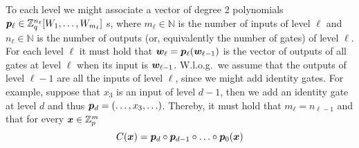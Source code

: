 To each level we might associate a vector of degree 2 polynomials ${\boldsymbol{p}}_\ell \in \mathbb{Z}_q^{n_\ell}[W_1,\ldots,W_{m_\ell}]$ s, where $m_\ell\in\mathbb{N}$ is the number of inputs of level $\ell$ and $n_\ell\in\mathbb{N}$ is the number of outputs (or, equivalently the number of gates) of level $\ell$. For each level $\ell$ it must hold that ${\boldsymbol{w}}_\ell={\boldsymbol{p}}_\ell({\boldsymbol{w}}_{\ell-1})$ is the vector of outputs of all gates at level $\ell$ when its input is ${\boldsymbol{w}}_{\ell-1}$.
W.l.o.g.~we assume that the outputs of level $\ell-1$ are all the inputs of level $\ell$, since we might add identity gates. For example, suppose that $x_3$ is an input of level $d-1$, then we add an identity gate at level $d$ and thus ${\boldsymbol{p}}_d=(\ldots,x_3,\ldots)$.
 Thereby, it must hold that $ m_\ell = n_{\ell-1}$ and that for every ${\boldsymbol{x}}\in\mathbb{Z}_p^m$
$$
C({\boldsymbol{x}}) = {\boldsymbol{p}}_{d}\circ{\boldsymbol{p}}_{d-1}\circ\ldots\circ {\boldsymbol{p}}_0 ({\boldsymbol{x}})
$$

